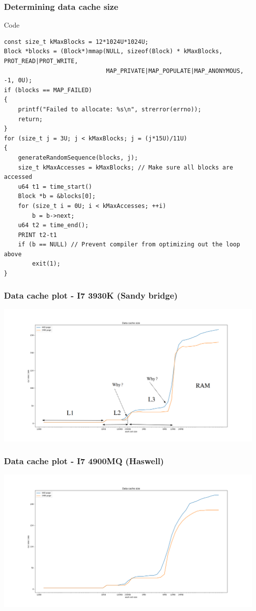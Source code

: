 \documentclass{beamer}
\begin{document}
\begin{frame}[fragile]
\frametitle{Determining data cache size}
\begin{block}{Code}
\begin{lstlisting}[style=code]
const size_t kMaxBlocks = 12*1024U*1024U;
Block *blocks = (Block*)mmap(NULL, sizeof(Block) * kMaxBlocks, PROT_READ|PROT_WRITE,
                             MAP_PRIVATE|MAP_POPULATE|MAP_ANONYMOUS, -1, 0U);
if (blocks == MAP_FAILED)
{
    printf("Failed to allocate: %s\n", strerror(errno));
    return;
}
for (size_t j = 3U; j < kMaxBlocks; j = (j*15U)/11U)
{
    generateRandomSequence(blocks, j);
    size_t kMaxAccesses = kMaxBlocks; // Make sure all blocks are accessed
    u64 t1 = time_start()
    Block *b = &blocks[0]; 
    for (size_t i = 0U; i < kMaxAccesses; ++i)
        b = b->next;
    u64 t2 = time_end();
    PRINT t2-t1
    if (b == NULL) // Prevent compiler from optimizing out the loop above
        exit(1);
}

\end{lstlisting}
\end{block}
\end{frame}

\begin{frame}
\frametitle{Data cache plot - I7 3930K (Sandy bridge)}
\centerline{\includegraphics[scale=.23]{img/data_cache_size_page.png}}
\end{frame}

\begin{frame}
\frametitle{Data cache plot - I7 4900MQ (Haswell)}
\centerline{\includegraphics[scale=.3]{img/data_cache_size_page_haswell.png}}
\end{frame}
\end{document}
